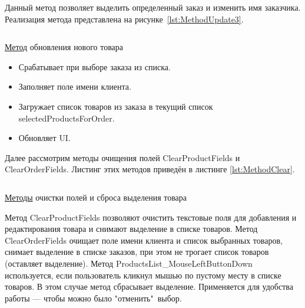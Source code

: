 \documentclass[12pt]{article}
\newcommand{\colorGIT}[1]{\textcolor{CtpLavender}{#1}}
\renewcommand{\texttt}[1]{{\small\ttfamily #1}}
\numberwithin{listing}{section}
\numberwithin{figure}{section}
\begin{document}
Данный метод позволяет выделить определенный заказ и изменить имя заказчика. Реализация метода представлена на рисунке~\ref{lst:MethodUpdate3}.

\begin{listing}[H]
	\inputminted[firstline=379, lastline=390]{csharp}{../../3lab/StoreManager/MainWindow.xaml.cs}
	\caption{\colorGIT{\href{https://github.com/WebMasterIT/Csharp_Labs/blob/ec375afd16c0647b337cf3d8a79c8bef904fc1be/3lab/StoreManager/MainWindow.xaml.cs\#L379-L390}{Метод}} обновления нового товара }
	\label{lst:MethodUpdate3}
\end{listing}

\begin{itemize}
	\item Срабатывает при выборе заказа из списка.
	\item Заполняет поле имени клиента.
	\item Загружает список товаров из заказа в текущий список \texttt{selectedProductsForOrder}.
	\item Обновляет \texttt{UI}.
\end{itemize}

{}


Далее рассмотрим методы очищения полей \texttt{ClearProductFields} и \texttt{ClearOrderFields}. Листинг этих методов приведён в листинге \ref{lst:MethodClear}.

\begin{listing}[H]
	\inputminted[firstline=392, lastline=432]{csharp}{../../3lab/StoreManager/MainWindow.xaml.cs}
	\caption{\colorGIT{\href{https://github.com/WebMasterIT/Csharp_Labs/blob/ec375afd16c0647b337cf3d8a79c8bef904fc1be/3lab/StoreManager/MainWindow.xaml.cs\#L379-L432}{Методы}} очистки полей и сброса выделения товара}
	\label{lst:MethodClear}
\end{listing}

Метод \texttt{ClearProductFields} позволяют очистить текстовые поля для добавления и редактирования товара и снимают выделение в списке товаров. Метод \texttt{ClearOrderFields} очищает поле имени клиента и список выбранных товаров, снимает выделение в списке заказов, при этом не трогает список товаров (оставляет выделение). Метод \texttt{ProductsList\_MouseLeftButtonDown} используется, если пользователь кликнул мышью по пустому месту в списке товаров. В этом случае метод сбрасывает выделение. Применяется для удобства работы — чтобы можно было "отменить"\ выбор.
\end{document}
